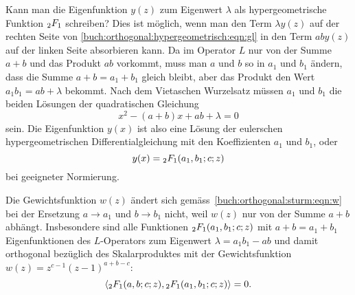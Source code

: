 Kann man die Eigenfunktion $y(z)$  zum Eigenwert $\lambda$ als
hypergeometrische Funktion $\mathstrut_2F_1$ schreiben?
Dies ist möglich, wenn man den Term $\lambda y(z)$ auf der rechten
Seite von \eqref{buch:orthogonal:hypergeometrisch:eqn:gl}
in den Term $aby(z)$ auf der linken Seite absorbieren kann.
Da im Operator $L$ nur von der Summe $a+b$ und das Produkt
$ab$ vorkommt,
muss man $a$ und $b$ so in $a_1$ und $b_1$ ändern, dass die Summe
$a+b=a_1+b_1$ gleich bleibt, aber das Produkt den Wert $a_1b_1=ab+\lambda$
bekommt.
Nach dem Vietaschen Wurzelsatz müssen
%
%
$a_1$ und $b_1$ die beiden Lösungen der quadratischen Gleichung
\[
x^2 - (a+b)x + ab+\lambda = 0
\]
sein.
Die Eigenfunktion $y(x)$ ist also eine Lösung der eulerschen
hypergeometrischen Differentialgleichung mit den Koeffizienten
$a_1$ und $b_1$, oder
\[
y(x) = \mathstrut_2F_1(a_1,b_1;c;z)
\]
bei geeigneter Normierung.

Die Gewichtsfunktion $w(z)$ ändert sich
gemäss~\eqref{buch:orthogonal:sturm:eqn:w} bei der Ersetzung $a\to a_1$
und $b\to b_1$ nicht, weil $w(z)$ nur von der Summe 
$a+b$ abhängt.
Insbesondere sind alle Funktionen $\mathstrut_2F_1(a_1,b_1;c;z)$
mit $a+b=a_1+b_1$ Eigenfunktionen des $L$-Operators zum Eigenwert
$\lambda=a_1b_1-ab$
und damit orthogonal bezüglich des Skalarproduktes
mit der Gewichtsfunktion $w(z)=z^{c-1}(z-1)^{a+b-c}$:
\[
\langle
\mathstrut_2F_1(a,b;c;z),
\mathstrut_2F_1(a_1,b_1;c;z)
\rangle
=
0.
\]







